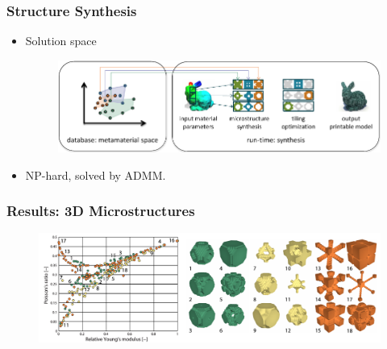 \documentclass[serif,mathserif]{beamer}
\begin{document}
\begin{frame}
  \frametitle{Structure Synthesis}
  \begin{itemize}
  \item Solution space
    \begin{figure}
      \includegraphics[width=\textwidth]{img/runtime}
    \end{figure}
  \item NP-hard, solved by ADMM.
  \end{itemize}
\end{frame}

\begin{frame}
  \frametitle{Results: 3D Microstructures}
  \begin{figure}
    \includegraphics[width=\textwidth]{img/micro3d}
  \end{figure}
\end{frame}

\begin{frame} 
\end{frame}
\end{document}
